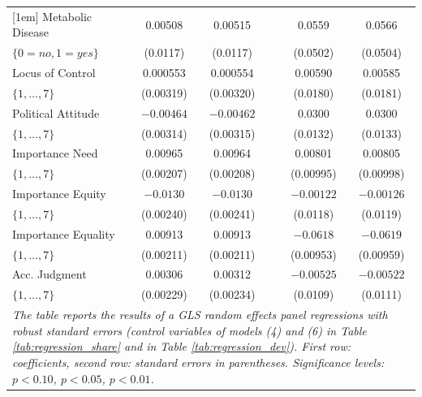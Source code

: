 \documentclass[smallcondensed]{svjour3}
\begin{document}
\begin{table}[ht]
{{\begin{tabularx}{13.5cm}{lccccc}
   [1em]
   Metabolic Disease        &   0.00508                &   0.00515                 &   &   0.0559                  &   0.0566                  \\
   $\{0=no,1=yes\}$         &  (0.0117)                &  (0.0117)                 &   &  (0.0502)                 &  (0.0504)                 \\
   [1em]
   Locus of Control         &   0.000553               &   0.000554                &   &   0.00590                 &   0.00585                 \\
   $\{1,\ldots,7\}$         &  (0.00319)               &  (0.00320)                &   &  (0.0180)                 &  (0.0181)                 \\
   [1em]
   Political Attitude       & $-0.00464$               & $-0.00462$                &   &   0.0300\sym{**}          &   0.0300\sym{**}          \\
   $\{1,\ldots,7\}$         &  (0.00314)               &  (0.00315)                &   &  (0.0132)                 &  (0.0133)                 \\
   [1em]
   Importance Need          &   0.00965\sym{***}       &   0.00964\sym{***}        &   &   0.00801                 &   0.00805                 \\
   $\{1,\ldots,7\}$         &  (0.00207)               &  (0.00208)                &   &  (0.00995)                &  (0.00998)                \\
   [1em]
   Importance Equity        & $-0.0130$\sym{***}       & $-0.0130$\sym{***}        &   & $-0.00122$                & $-0.00126$                \\
   $\{1,\ldots,7\}$         &  (0.00240)               &  (0.00241)                &   &  (0.0118)                 &  (0.0119)                 \\
   [1em]
   Importance Equality      &   0.00913\sym{***}       &   0.00913\sym{***}        &   & $-0.0618$\sym{***}        & $-0.0619$\sym{***}        \\
   $\{1,\ldots,7\}$         &  (0.00211)               &  (0.00211)                &   &  (0.00953)                &  (0.00959)                \\
   [1em]
   Acc. Judgment            &   0.00306                &   0.00312                 &   & $-0.00525$                & $-0.00522$                \\
   $\{1,\ldots,7\}$         &  (0.00229)               &  (0.00234)                &   &  (0.0109)                 &  (0.0111)                 \\
   [1em]\hline
\multicolumn{6}{p{13cm}}{\footnotesize \textit{The table reports the results of a GLS random effects panel regressions with robust standard errors (control variables of models (4) and (6) in Table \ref{tab:regression_share} and in Table \ref{tab:regression_dev}). First row: coefficients, second row: standard errors in parentheses. Significance levels: \sym{*} \(p<0.10\), \sym{**} \(p<0.05\), \sym{***} \(p<0.01\).}}
\end{tabularx}
}}
\end{table}
\end{document}
